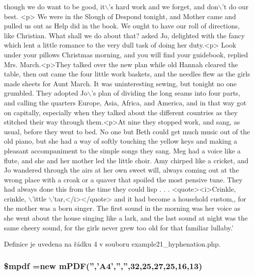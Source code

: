 \begin{DoxyCode}
{       though we do want to be good, it\(\backslash\)'s hard work and we forget, and don\(\backslash\)'t do our best. <p> We were in the
       Slough of Despond tonight, and Mother came and pulled us out as Help did in the book. We ought to have our roll
       of directions, like Christian. What shall we do about that?  asked Jo, delighted with the fancy which lent a
       little romance to the very dull task of doing her duty.<p> Look under your pillows Christmas morning, and
       you will find your guidebook,  replied Mrs. March.<p>They talked over the new plan while old Hannah cleared
       the table, then out came the four little work baskets, and the needles flew as the girls made sheets for Aunt
       March. It was uninteresting sewing, but tonight no one grumbled. They adopted Jo\(\backslash\)'s plan of dividing the
       long seams into four parts, and calling the quarters Europe, Asia, Africa, and America, and in that way got on
       capitally, especially when they talked about the different countries as they stitched their way through
       them.<p>At nine they stopped work, and sang, as usual, before they went to bed. No one but Beth could get much
       music out of the old piano, but she had a way of softly touching the yellow keys and making a pleasant
       accompaniment to the simple songs they sang. Meg had a voice like a flute, and she and her mother led the little
       choir. Amy chirped like a cricket, and Jo wandered through the airs at her own sweet will, always coming out
       at the wrong place with a croak or a quaver that spoiled the most pensive tune. They had always done this
       from the time they could lisp . . . <quote><i>Crinkle, crinkle, \(\backslash\)'ittle \(\backslash\)'tar,</i></quote> and it had become a
       household custom,, for the mother was a born singer. The first sound in the morning was her voice as she
       went about the house singing like a lark, and the last sound at night was the same cheery sound, for the girls
       never grew too old for that familiar lullaby.'}
\end{DoxyCode}


Definice je uvedena na řádku 4 v souboru example21\-\_\-hyphenation.\-php.

\hypertarget{example21__hyphenation_8php_ad028f81910d6cbab9b184d2214b3a8f8}{
\subsubsection[{\$mpdf}]{\setlength{\rightskip}{0pt plus 5cm}\$mpdf =new {\bf m\-P\-D\-F}('','A4','','',32,25,27,25,16,13)}}\label{example21__hyphenation_8php_ad028f81910d6cbab9b184d2214b3a8f8}


